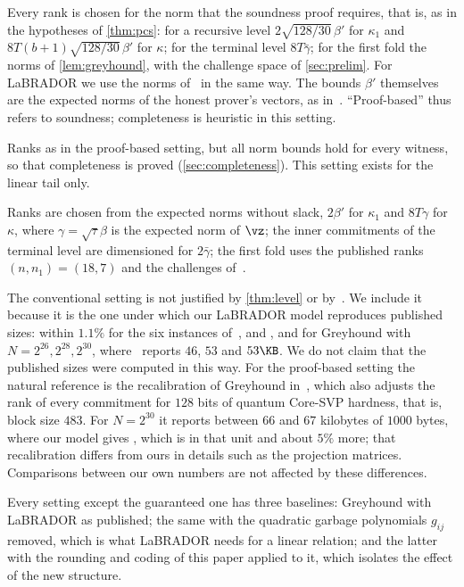 \begin{description}[leftmargin=1.2em,itemsep=2pt]
\item[Proof-based.] Every rank is chosen for the norm that the soundness proof requires, that is, as in the hypotheses of \cref{thm:pcs}: for a recursive level $2\sqrt{128/30}\,\beta'$ for $\kappa_1$ and $8T(b+1)\sqrt{128/30}\,\beta'$ for $\kappa$; for the terminal level $8T\bar\gamma$; for the first fold the norms of \cref{lem:greyhound}, with the challenge space of \cref{sec:prelim}. For LaBRADOR we use the norms of~\cite[Theorem~5.1]{BS23} in the same way. The bounds $\beta'$ themselves are the expected norms of the honest prover's vectors, as in~\cite{BS23}. ``Proof-based'' thus refers to soundness; completeness is heuristic in this setting.
\item[Guaranteed.] Ranks as in the proof-based setting, but all norm bounds hold for every witness, so that completeness is proved (\cref{sec:completeness}). This setting exists for the linear tail only.
\item[Conventional.] Ranks are chosen from the expected norms without slack, $2\beta'$ for $\kappa_1$ and $8T\gamma$ for $\kappa$, where $\gamma=\sqrt\tau\beta$ is the expected norm of $\vz$; the inner commitments of the terminal level are dimensioned for $2\bar\gamma$; the first fold uses the published ranks $(n,n_1)=(18,7)$ and the challenges of~\cite{NS24}.
\end{description}

The conventional setting is not justified by \cref{thm:level} or by~\cite[Theorem~5.1]{BS23}. We include it because it is the one under which our LaBRADOR model reproduces published sizes: within $1.1\%$ for the six instances of~\cite[Table~2]{BS23}, and \nBCa, \nBCb{} and \nBCc\KB{} for Greyhound with $N=2^{26},2^{28},2^{30}$, where~\cite{NS24} reports $46$, $53$ and $53\KB$. We do not claim that the published sizes were computed in this way. For the proof-based setting the natural reference is the recalibration of Greyhound in~\cite{DBK26}, which also adjusts the rank of every commitment for $128$ bits of quantum Core-SVP hardness, that is, block size $483$. For $N=2^{30}$ it reports between $66$ and $67$ kilobytes of $1000$ bytes, where our model gives \nBQc\KB, which is \nBQcDec{} in that unit and about $5\%$ more; that recalibration differs from ours in details such as the projection matrices. Comparisons between our own numbers are not affected by these differences.

Every setting except the guaranteed one has three baselines: Greyhound with LaBRADOR as published; the same with the quadratic garbage polynomials $g_{ij}$ removed, which is what LaBRADOR needs for a linear relation; and the latter with the rounding and coding of this paper applied to it, which isolates the effect of the new structure.

